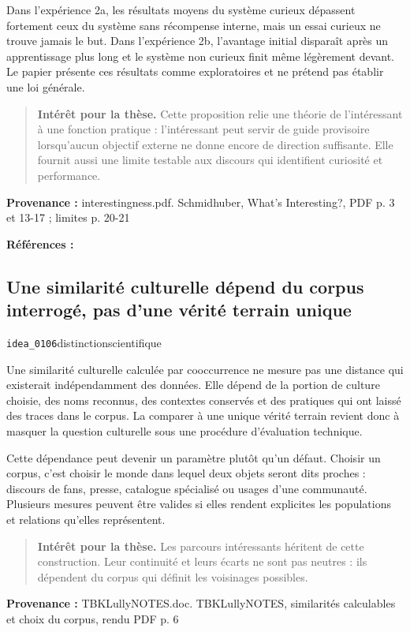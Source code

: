 \documentclass[10pt,a4paper]{article}
\begin{document}
Dans l'expérience 2a, les résultats moyens du système curieux dépassent fortement ceux du système sans récompense interne, mais un essai curieux ne trouve jamais le but. Dans l'expérience 2b, l'avantage initial disparaît après un apprentissage plus long et le système non curieux finit même légèrement devant. Le papier présente ces résultats comme exploratoires et ne prétend pas établir une loi générale.

\begin{quote}
\textbf{Intérêt pour la thèse.} Cette proposition relie une théorie de l'intéressant à une fonction pratique : l'intéressant peut servir de guide provisoire lorsqu'aucun objectif externe ne donne encore de direction suffisante. Elle fournit aussi une limite testable aux discours qui identifient curiosité et performance.
\end{quote}
{\footnotesize\color{metadata}\textbf{Provenance :} interestingness.pdf. Schmidhuber, What's Interesting?, PDF p. 3 et 13-17 ; limites p. 20-21\par}
{\footnotesize\color{metadata}\textbf{Références :} \parencite{schmidhuber1997interesting}\par}

\subsection{Une similarité culturelle dépend du corpus interrogé, pas d'une vérité terrain unique}
{\small\color{metadata} \texttt{idea\_0106}\quad\textbullet\quad distinction\quad\textbullet\quad scientifique\par}

Une similarité culturelle calculée par cooccurrence ne mesure pas une distance qui existerait indépendamment des données. Elle dépend de la portion de culture choisie, des noms reconnus, des contextes conservés et des pratiques qui ont laissé des traces dans le corpus. La comparer à une unique vérité terrain revient donc à masquer la question culturelle sous une procédure d'évaluation technique.

Cette dépendance peut devenir un paramètre plutôt qu'un défaut. Choisir un corpus, c'est choisir le monde dans lequel deux objets seront dits proches : discours de fans, presse, catalogue spécialisé ou usages d'une communauté. Plusieurs mesures peuvent être valides si elles rendent explicites les populations et relations qu'elles représentent.

\begin{quote}
\textbf{Intérêt pour la thèse.} Les parcours intéressants héritent de cette construction. Leur continuité et leurs écarts ne sont pas neutres : ils dépendent du corpus qui définit les voisinages possibles.
\end{quote}
{\footnotesize\color{metadata}\textbf{Provenance :} TBKLullyNOTES.doc. TBKLullyNOTES, similarités calculables et choix du corpus, rendu PDF p. 6\par}
\end{document}
